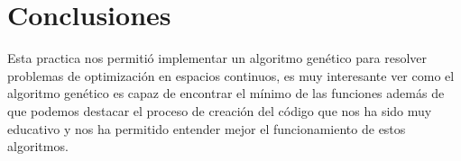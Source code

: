 \documentclass{report}
\begin{document}
    \newpage
    \section*{Conclusiones}
    Esta practica nos permitió implementar un algoritmo genético para resolver problemas de optimización en espacios continuos, es muy
    interesante ver como el algoritmo genético es capaz de encontrar el mínimo de las funciones además de que
    podemos destacar el proceso de creación del código que nos ha sido muy educativo y nos ha permitido entender mejor el funcionamiento de estos algoritmos.
\end{document}
